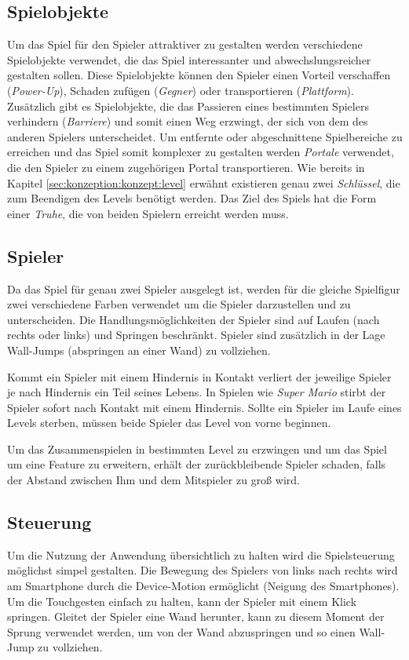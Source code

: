 \subsection{Spielobjekte}
\label{sec:konzeption:konzept:spielobjekte}
Um das Spiel für den Spieler attraktiver zu gestalten werden verschiedene Spielobjekte verwendet, die das Spiel interessanter und abwechslungsreicher gestalten sollen. Diese Spielobjekte können den Spieler einen Vorteil verschaffen (\textit{Power-Up}), Schaden zufügen (\textit{Gegner}) oder transportieren (\textit{Plattform}). Zusätzlich gibt es Spielobjekte, die das Passieren eines bestimmten Spielers verhindern (\textit{Barriere}) und somit einen Weg erzwingt, der sich von dem des anderen Spielers unterscheidet. Um entfernte oder abgeschnittene Spielbereiche zu erreichen und das Spiel somit komplexer zu gestalten werden \textit{Portale} verwendet, die den Spieler zu einem zugehörigen Portal transportieren. Wie bereits in Kapitel \ref{sec:konzeption:konzept:level} erwähnt existieren genau zwei \textit{Schlüssel}, die zum Beendigen des Levels benötigt werden. Das Ziel des Spiels hat die Form einer \textit{Truhe}, die von beiden Spielern erreicht werden muss.

\subsection{Spieler}
\label{sec:konzeption:konzept:spieler}
Da das Spiel für genau zwei Spieler ausgelegt ist, werden für die gleiche Spielfigur zwei verschiedene Farben verwendet um die Spieler darzustellen und zu unterscheiden. Die Handlungsmöglichkeiten der Spieler sind auf Laufen (nach rechts oder links) und Springen beschränkt. Spieler sind zusätzlich in der Lage Wall-Jumps (abspringen an einer Wand) zu vollziehen.

Kommt ein Spieler mit einem Hindernis in Kontakt verliert der jeweilige Spieler je nach Hindernis ein Teil seines Lebens. In Spielen wie \textit{Super Mario} stirbt der Spieler sofort nach Kontakt mit einem Hindernis. Sollte ein Spieler im Laufe eines Levels sterben, müssen beide Spieler das Level von vorne beginnen.

Um das Zusammenspielen in bestimmten Level zu erzwingen und um das Spiel um eine Feature zu erweitern, erhält der zurückbleibende Spieler schaden, falls der Abstand zwischen Ihm und dem Mitspieler zu groß wird.

\subsection{Steuerung}
\label{sec:konzeption:konzept:steuerung}
Um die Nutzung der Anwendung übersichtlich zu halten wird die Spielsteuerung möglichst simpel gestalten. Die Bewegung des Spielers von links nach rechts wird am Smartphone durch die Device-Motion ermöglicht (Neigung des Smartphones). Um die Touchgesten einfach zu halten, kann der Spieler mit einem Klick springen. Gleitet der Spieler eine Wand herunter, kann zu diesem Moment der Sprung verwendet werden, um von der Wand abzuspringen und so einen Wall-Jump zu vollziehen. 


